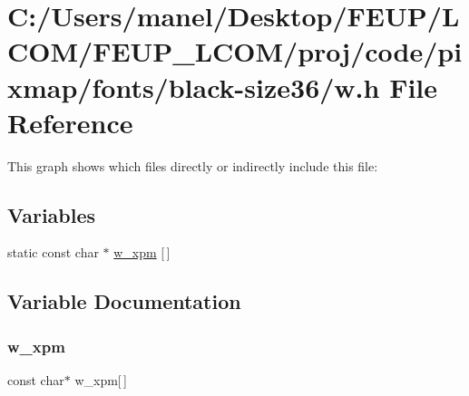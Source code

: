 \hypertarget{black-size36_2w_8h}{}\section{C\+:/\+Users/manel/\+Desktop/\+F\+E\+U\+P/\+L\+C\+O\+M/\+F\+E\+U\+P\+\_\+\+L\+C\+O\+M/proj/code/pixmap/fonts/black-\/size36/w.h File Reference}
\label{black-size36_2w_8h}
This graph shows which files directly or indirectly include this file\+:
\subsection*{Variables}
\begin{DoxyCompactItemize}
\item 
static const char $\ast$ \mbox{\hyperlink{black-size36_2w_8h_a770f11b2ac8c61e7726aec6082dd3bf0}{w\+\_\+xpm}} \mbox{[}$\,$\mbox{]}
\end{DoxyCompactItemize}


\subsection{Variable Documentation}
\mbox{\label{black-size36_2w_8h_a770f11b2ac8c61e7726aec6082dd3bf0}} 
\subsubsection{\texorpdfstring{w\_xpm}{w\_xpm}}
{\footnotesize\ttfamily const char$\ast$ w\+\_\+xpm\mbox{[}$\,$\mbox{]}\hspace{0.3cm}{\ttfamily [static]}}

